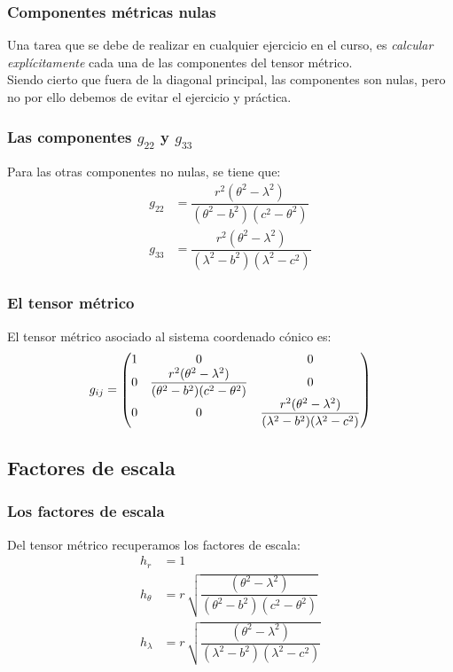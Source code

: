 \documentclass[12pt]{beamer}
\begin{document}
\begin{frame}
\frametitle{Componentes métricas nulas}
Una tarea que se debe de realizar en cualquier ejercicio en el curso, es \emph{calcular explícitamente} cada una de las componentes del tensor métrico.
\\
\bigskip
\pause
Siendo cierto que fuera de la diagonal principal, las componentes son nulas, pero no por ello debemos de evitar el ejercicio y práctica.
\end{frame}
\begin{frame}
\frametitle{Las componentes $g_{22}$ y $g_{33}$}
Para las otras componentes no nulas, se tiene que:
\pause
\begin{align*}
g_{22} &= \dfrac{r^{2} (\theta^{2} - \lambda^{2})}{(\theta^{2} - b^{2})(c^{2} - \theta^{2})} \\[0.5em]
g_{33} &= \dfrac{r^{2} (\theta^{2} - \lambda^{2})}{(\lambda^{2} - b^{2})(\lambda^{2} - c^{2})}
\end{align*}
\end{frame}
\begin{frame}
\frametitle{El tensor métrico}
El tensor métrico asociado al sistema coordenado cónico es:
\pause
\begin{align*}
g_{ij} = \mqty(
1 & 0 & 0 \\
0 & \dfrac{r^{2} (\theta^{2} - \lambda^{2})}{(\theta^{2} - b^{2})(c^{2} - \theta^{2})} & 0 \\
0 & 0 & \dfrac{r^{2} (\theta^{2} - \lambda^{2})}{(\lambda^{2} - b^{2})(\lambda^{2} - c^{2})}
)
\end{align*}
\end{frame}

\subsection{Factores de escala}

\begin{frame}
\frametitle{Los factores de escala}
Del tensor métrico recuperamos los factores de escala:
\pause
\begin{align*}
h_{r} &= 1 \\[0.5em]
h_{\theta} &=  r \, \sqrt{\dfrac{(\theta^{2} - \lambda^{2})}{(\theta^{2} - b^{2})(c^{2} - \theta^{2})}} \\[0.5em]
h_{\lambda} &= r \, \sqrt{\dfrac{(\theta^{2} - \lambda^{2})}{(\lambda^{2} - b^{2})(\lambda^{2} - c^{2})}}
\end{align*}
\end{frame}
\end{document}
